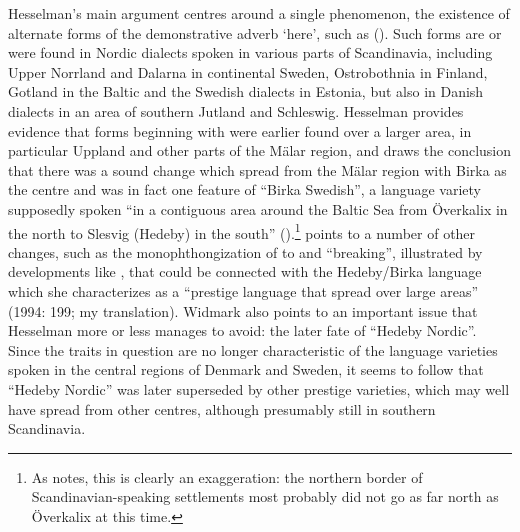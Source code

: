Hesselman’s main argument centres around a single phenomenon, the existence of alternate forms of the demonstrative adverb  ‘here’, such as  (). Such forms are or were found in Nordic dialects spoken in various parts of Scandinavia, including Upper Norrland and Dalarna in continental Sweden, Ostrobothnia in Finland, Gotland in the Baltic and the Swedish dialects in Estonia, but also in Danish dialects in an area of southern Jutland and Schleswig. Hesselman provides evidence that forms beginning with  were earlier found over a larger area, in particular Uppland and other parts of the Mälar region, and draws the conclusion that there was a sound change  which spread from the Mälar region with Birka as the centre and was in fact one feature of “Birka Swedish”, a language variety supposedly spoken “in a contiguous area around the Baltic Sea from Överkalix in the north to Slesvig (Hedeby) in the south” (\citealt[158]{Hesselman1936}).\footnote{ As \citet{Widmark1994} notes, this is clearly an exaggeration: the northern border of Scandinavian-speaking settlements most probably did not go as far north as Överkalix at this time.} \citet{Widmark1994} points to a number of other changes,  such as the monophthongization of  to and “breaking”, illustrated by developments like , that could be connected with the Hedeby/Birka language which she characterizes as a “prestige language that spread over large areas” (1994: 199; my translation). Widmark also points to an important issue that Hesselman more or less manages to avoid: the later fate of “Hedeby Nordic”. Since the traits in question are no longer characteristic of the language varieties spoken in the central regions of Denmark and Sweden, it seems to follow that “Hedeby Nordic” was later superseded by other prestige varieties, which may well have spread from other centres, although presumably still in southern Scandinavia. 

